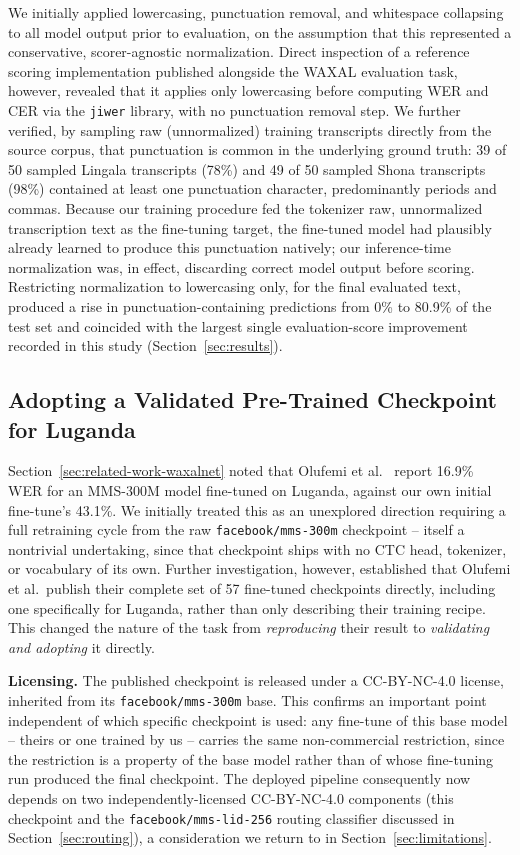 \documentclass[11pt]{article}
\begin{document}
We initially applied lowercasing, punctuation removal, and whitespace collapsing to all model output prior to evaluation, on the assumption that this represented a conservative, scorer-agnostic normalization. Direct inspection of a reference scoring implementation published alongside the WAXAL evaluation task, however, revealed that it applies only lowercasing before computing WER and CER via the \texttt{jiwer} library, with no punctuation removal step. We further verified, by sampling raw (unnormalized) training transcripts directly from the source corpus, that punctuation is common in the underlying ground truth: 39 of 50 sampled Lingala transcripts (78\%) and 49 of 50 sampled Shona transcripts (98\%) contained at least one punctuation character, predominantly periods and commas. Because our training procedure fed the tokenizer raw, unnormalized transcription text as the fine-tuning target, the fine-tuned model had plausibly already learned to produce this punctuation natively; our inference-time normalization was, in effect, discarding correct model output before scoring. Restricting normalization to lowercasing only, for the final evaluated text, produced a rise in punctuation-containing predictions from 0\% to 80.9\% of the test set and coincided with the largest single evaluation-score improvement recorded in this study (Section~\ref{sec:results}).

\subsection{Adopting a Validated Pre-Trained Checkpoint for Luganda}
\label{sec:luganda-swap}

Section~\ref{sec:related-work-waxalnet} noted that Olufemi et al.\ \cite{olufemi2026waxalnet} report 16.9\% WER for an MMS-300M model fine-tuned on Luganda, against our own initial fine-tune's 43.1\%. We initially treated this as an unexplored direction requiring a full retraining cycle from the raw \texttt{facebook/mms-300m} checkpoint -- itself a nontrivial undertaking, since that checkpoint ships with no CTC head, tokenizer, or vocabulary of its own. Further investigation, however, established that Olufemi et al.\ publish their complete set of 57 fine-tuned checkpoints directly, including one specifically for Luganda, rather than only describing their training recipe. This changed the nature of the task from \emph{reproducing} their result to \emph{validating and adopting} it directly.

\textbf{Licensing.} The published checkpoint is released under a CC-BY-NC-4.0 license, inherited from its \texttt{facebook/mms-300m} base. This confirms an important point independent of which specific checkpoint is used: any fine-tune of this base model -- theirs or one trained by us -- carries the same non-commercial restriction, since the restriction is a property of the base model rather than of whose fine-tuning run produced the final checkpoint. The deployed pipeline consequently now depends on two independently-licensed CC-BY-NC-4.0 components (this checkpoint and the \texttt{facebook/mms-lid-256} routing classifier discussed in Section~\ref{sec:routing}), a consideration we return to in Section~\ref{sec:limitations}.
\end{document}
